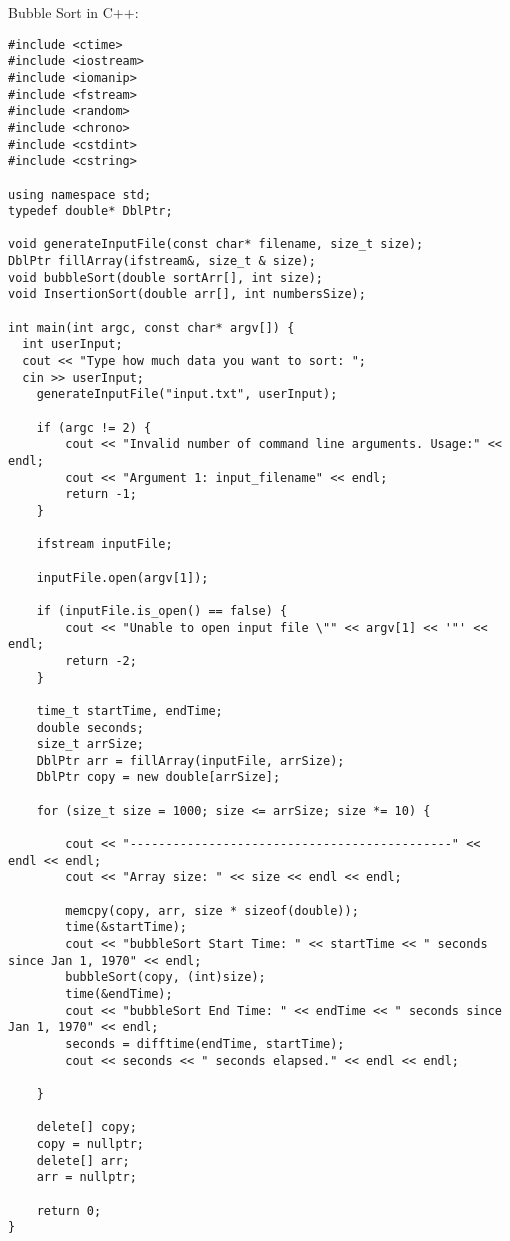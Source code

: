 \documentclass{article}
\begin{document}
\newline\newline Bubble Sort in C++:
\begin{lstlisting}
#include <ctime>
#include <iostream>
#include <iomanip>
#include <fstream>
#include <random>
#include <chrono>
#include <cstdint>
#include <cstring>

using namespace std;
typedef double* DblPtr;

void generateInputFile(const char* filename, size_t size);
DblPtr fillArray(ifstream&, size_t & size);
void bubbleSort(double sortArr[], int size);
void InsertionSort(double arr[], int numbersSize);

int main(int argc, const char* argv[]) {
  int userInput;
  cout << "Type how much data you want to sort: ";
  cin >> userInput;
    generateInputFile("input.txt", userInput);

    if (argc != 2) {
        cout << "Invalid number of command line arguments. Usage:" << endl;
        cout << "Argument 1: input_filename" << endl;
        return -1;
    }

    ifstream inputFile;

    inputFile.open(argv[1]);

    if (inputFile.is_open() == false) {
        cout << "Unable to open input file \"" << argv[1] << '"' << endl;
        return -2;
    }

    time_t startTime, endTime;
    double seconds;
    size_t arrSize;
    DblPtr arr = fillArray(inputFile, arrSize);
    DblPtr copy = new double[arrSize];

    for (size_t size = 1000; size <= arrSize; size *= 10) {

        cout << "---------------------------------------------" << endl << endl;
        cout << "Array size: " << size << endl << endl;

        memcpy(copy, arr, size * sizeof(double));
        time(&startTime);
        cout << "bubbleSort Start Time: " << startTime << " seconds since Jan 1, 1970" << endl;
        bubbleSort(copy, (int)size);
        time(&endTime);
        cout << "bubbleSort End Time: " << endTime << " seconds since Jan 1, 1970" << endl;
        seconds = difftime(endTime, startTime);
        cout << seconds << " seconds elapsed." << endl << endl;

    }

    delete[] copy;
    copy = nullptr;
    delete[] arr;
    arr = nullptr;

    return 0;
}


\end{lstlisting}
\end{document}
